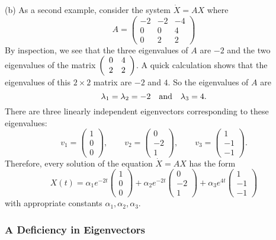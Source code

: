 \noindent (b) As a second example, consider the system $\dot{X} = AX$ where
\begin{equation*} \label{eq:exsyslin1}
A = 
\left(\begin{array}{rrr}
-2 & -2 & -4 \\
 0 & 0 & 4 \\
 0 & 2 & 2
\end{array}\right)
\end{equation*}
By inspection, we see that the three eigenvalues of $A$ are $-2$ and the two
eigenvalues of the matrix $\left(\begin{array}{rr} 0 & 4\\ 2 &2\end{array}\right)$.  A quick calculation shows
that the eigenvalues of this $2\times 2$ matrix are $-2$ and $4$.  So the 
eigenvalues of $A$ are
\[
\lambda_1=\lambda_2=-2 \quad\mbox{and}\quad \lambda_3=4.
\]
There are three linearly independent eigenvectors corresponding to these 
eigenvalues: 
\[
v_1=\left(\begin{array}{r}
1 \\ 0 \\ 0
\end{array}\right),\qquad
v_2=\left(\begin{array}{r}
0 \\ -2 \\ 1
\end{array}\right),\qquad
v_3=\left(\begin{array}{r}
1 \\ -1 \\ -1
\end{array}\right).
\]
Therefore, every solution of the equation $\dot X=AX$ has the form
\[
X(t)=\alpha_1e^{-2t}\left(\begin{array}{r}
1 \\ 0 \\ 0
\end{array}\right) + \alpha_2e^{-2t}\left(\begin{array}{r}
0 \\ -2 \\ 1\end{array}\right) + \alpha_3e^{4t}\left(\begin{array}{r}
1 \\ -1 \\ -1
\end{array}\right)
\] 
with appropriate constants $\alpha_1,\alpha_2,\alpha_3$.


\subsubsection*{A Deficiency in Eigenvectors}

